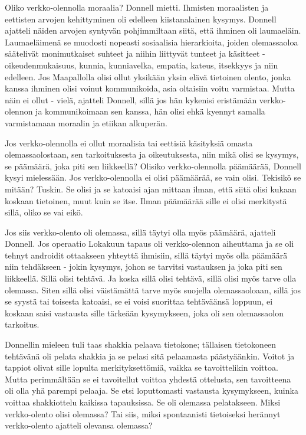 Oliko verkko-olennolla moraalia? Donnell mietti. Ihmisten moraalisten ja eettisten arvojen kehittyminen oli edelleen kiistanalainen kysymys. Donnell ajatteli näiden arvojen syntyvän pohjimmiltaan siitä, että ihminen oli laumaeläin. Laumaeläimenä se muodosti nopeasti sosiaalisia hierarkioita, joiden olemassaoloa säätelivät monimutkaiset suhteet ja niihin liittyvät tunteet ja käsitteet - oikeudenmukaisuus, kunnia, kunniavelka, empatia, kateus, itsekkyys ja niin edelleen. Jos Maapallolla olisi ollut yksikään yksin elävä tietoinen olento, jonka kanssa ihminen olisi voinut kommunikoida, asia oltaisiin voitu varmistaa. Mutta näin ei ollut - vielä, ajatteli Donnell, sillä jos hän kykenisi eristämään verkko-olennon ja kommunikoimaan sen kanssa, hän olisi ehkä kyennyt samalla varmistamaan moraalin ja etiikan alkuperän.


Jos verkko-olennolla ei ollut moraalisia tai eettisiä käsityksiä omasta olemassaolostaan, sen tarkoituksesta ja oikeutuksesta, niin mikä olisi se kysymys, se päämäärä, joka piti sen liikkeellä? Olisiko verkko-olennolla päämäärää, Donnell kysyi mielessään. Jos verkko-olennolla ei olisi päämäärää, se vain olisi. Tekisikö se mitään? Tuskin. Se olisi ja se katoaisi ajan mittaan ilman, että siitä olisi kukaan koskaan tietoinen, muut kuin se itse. Ilman päämäärää sille ei olisi merkitystä sillä, oliko se vai eikö.


Jos siis verkko-olento oli olemassa, sillä täytyi olla myös päämäärä, ajatteli Donnell. Jos operaatio Lokakuun tapaus oli verkko-olennon aiheuttama ja se oli tehnyt androidit ottaakseen yhteyttä ihmisiin, sillä täytyi myös olla päämäärä niin tehdäkseen - jokin kysymys, johon se tarvitsi vastauksen ja joka piti sen liikkeellä. Sillä olisi tehtävä. Ja koska sillä olisi tehtävä, sillä olisi myös tarve olla olemassa. Siten sillä olisi väistämättä tarve myös suojella olemassaoloaan, sillä jos se syystä tai toisesta katoaisi, se ei voisi suorittaa tehtäväänsä loppuun, ei koskaan saisi vastausta sille tärkeään kysymykseen, joka oli sen olemassaolon tarkoitus.


Donnellin mieleen tuli taas shakkia pelaava tietokone; tällaisen tietokoneen tehtävänä oli pelata shakkia ja se pelasi sitä pelaamasta päästyäänkin. Voitot ja tappiot olivat sille lopulta merkityksettömiä, vaikka se tavoittelikin voittoa. Mutta perimmältään se ei tavoitellut voittoa yhdestä ottelusta, sen tavoitteena oli olla yhä parempi pelaaja. Se etsi loputtomasti vastausta kysymykseen, kuinka voittaa shakkiottelu kaikissa tapauksissa. Se oli olemassa pelatakseen. Miksi verkko-olento olisi olemassa? Tai siis, miksi spontaanisti tietoiseksi herännyt verkko-olento ajatteli olevansa olemassa?


